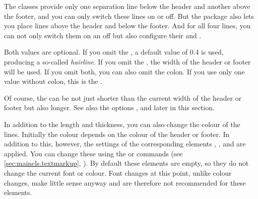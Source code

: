 \begin{Declaration}
\end{Declaration}
%
%
%
%
The \KOMAScript{} classes provide only one separation line below the header
and another above the footer, and you can only switch these lines on or off.
But the  package also lets you place lines above the
header and below the footer. And for all four lines, you can not only switch
them on an off but also configure their  and .

Both values are optional. If you omit the , a default value
of 0.4 is used, producing a so-called \emph{hairline}. If you omit
the , the width of the header or footer will be used. If you
omit both, you can also omit the colon. If you use only one value without
colon, this is the .

Of course, the  can be not just shorter than the current width
of the header or footer but also longer. See also the options 
%
,
 and
 later in this section.

\BeginIndexGroup
{}%
%
%
%
In addition to the length and thickness, you can also change the colour of the
lines. Initially the colour depends on the colour of the header or footer. In
addition to this, however, the settings of the corresponding elements
 ,
,  and
 are applied. You can
change these using the  or
 commands (see
\autoref{sec:maincls.textmarkup}, ).
By default these elements are empty, so they do not change the current font or
colour. Font changes at this point, unlike colour changes, make little sense
anyway and are therefore not recommended for these elements.%
\EndIndexGroup
%
\EndIndexGroup


